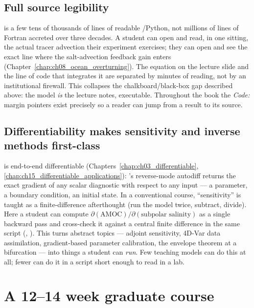 \subsection{Full source legibility}

\model{} is a few tens of thousands of lines of readable \jax{}/Python, not millions of lines of
Fortran accreted over three decades. A student can open 
and read, in one sitting, the actual tracer advection their experiment exercises; they can open
 and see the exact line where the salt-advection feedback
gain enters (Chapter~\ref{chap:ch08_ocean_overturning}). The equation on the lecture slide and the
line of code that integrates it are separated by minutes of reading, not by an institutional
firewall. This collapses the chalkboard/black-box gap described above: the model \emph{is} the
lecture notes, executable. Throughout the book the \emph{Code:} margin pointers exist precisely so
a reader can jump from a result to its source.

\subsection{Differentiability makes sensitivity and inverse methods first-class}

\model{} is end-to-end differentiable (Chapters~\ref{chap:ch03_differentiable},
\ref{chap:ch15_differentiable_applications}): \jax{}'s reverse-mode autodiff
\citep{jax2018} returns the exact gradient of any scalar diagnostic with respect to any input ---
a parameter, a boundary condition, an initial state. In a conventional course, ``sensitivity'' is
taught as a finite-difference afterthought (run the model twice, subtract, divide). Here a student
can compute $\partial(\text{AMOC})/\partial(\text{subpolar salinity})$ as a single backward pass
and cross-check it against a central finite difference in the same script
(, ). This
turns abstract topics --- adjoint sensitivity, 4D-Var data assimilation, gradient-based parameter
calibration, the envelope theorem at a bifurcation --- into things a student can \emph{run}. Few
teaching models can do this at all; fewer can do it in a script short enough to read in a lab.

\section{A 12--14 week graduate course}

